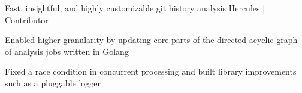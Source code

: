 \begin{cventries}
  \cventry
    {Fast, insightful, and highly customizable git history analysis} %
    {Hercules | Contributor} %
    {} %
    {} %
    {
      \begin{cvitems} %
        \item {Enabled higher granularity by updating core parts of the directed acyclic graph of analysis jobs written in Golang}
        \item {Fixed a race condition in concurrent processing and built library improvements such as a pluggable logger}
      \end{cvitems}
    }

\end{cventries}

